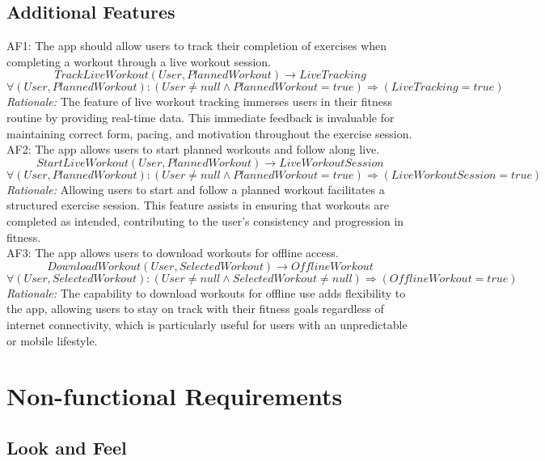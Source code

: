 \documentclass[12pt]{article}
\begin{document}
\subsection{Additional Features}
AF1: The app should allow users to track their completion of exercises when completing a workout through a live workout session.
\[TrackLiveWorkout(User, PlannedWorkout) \rightarrow LiveTracking \]
\[ \forall (User, PlannedWorkout): (User \neq null \land PlannedWorkout = true) \Rightarrow (LiveTracking = true) \]
\textit{Rationale:} The feature of live workout tracking immerses users in their fitness routine by providing real-time data. This immediate feedback is invaluable for maintaining correct form, pacing, and motivation throughout the exercise session.
\\

AF2: The app allows users to start planned workouts and follow along live.
\[StartLiveWorkout(User, PlannedWorkout) \rightarrow LiveWorkoutSession \]
\[ \forall (User, PlannedWorkout): (User \neq null \land PlannedWorkout = true) \Rightarrow (LiveWorkoutSession = true) \]
\textit{Rationale:} Allowing users to start and follow a planned workout facilitates a structured exercise session. This feature assists in ensuring that workouts are completed as intended, contributing to the user’s consistency and progression in fitness.
\\

AF3: The app allows users to download workouts for offline access.
\[DownloadWorkout(User, SelectedWorkout) \rightarrow OfflineWorkout \]
\[ \forall (User, SelectedWorkout): (User \neq null \land SelectedWorkout \neq null) \Rightarrow (OfflineWorkout = true) \]
\textit{Rationale:} The capability to download workouts for offline use adds flexibility to the app, allowing users to stay on track with their fitness goals regardless of internet connectivity, which is particularly useful for users with an unpredictable or mobile lifestyle.\\

\section{Non-functional Requirements}

\subsection{Look and Feel}
\end{document}
